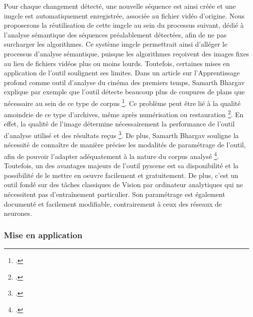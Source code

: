 Pour chaque changement détecté, une nouvelle séquence est ainsi créée et une \gls{imgcle} est automatiquement enregistrée, associée au fichier vidéo d'origine. Nous proposerons la réutilisation de cette \gls{imgcle} au sein du processus suivant, dédié à l'analyse sémantique des séquences préalablement détectées, afin de ne pas surcharger les algorithmes. Ce système \gls{imgcle} permettrait ainsi d’alléger le processus d’analyse sémantique, puisque les algorithmes reçoivent des images fixes au lieu de fichiers vidéos plus ou moins lourds. 
Toutefois, certaines mises en application de l'outil soulignent ses limites. Dans un article sur l'\gls{Apprentissage profond} comme outil d'analyse du cinéma des premiers temps, Samarth Bhargav explique par exemple que l'outil détecte beaucoup plus de coupures de plans que nécessaire au sein de ce type de corpus \footcite{bhargav2019}. Ce problème peut être lié à la qualité amoindrie de ce type d'archives, même après numérisation ou restauration \footcite{bhargav2019}. En effet, la qualité de l'image détermine nécessairement la performance de l'outil d'analyse utilisé et des résultats reçus \footcite{norindr2023}. De plus, Samarth Bhargav souligne la nécessité de connaître de manière précise les modalités de paramétrage de l'outil, afin de pouvoir l'adapter adéquatement à la nature du corpus analysé \footcite{bhargav2019}. Toutefois, un des avantages majeurs de l'outil \gls{pyscene} est sa disponibilité et la possibilité de le mettre en oeuvre facilement et gratuitement. De plus, c'est un outil fondé sur des tâches classiques de \gls{Vision par ordinateur} analytiques qui ne nécessitent pas d'entraînement particulier. Son paramétrage est également documenté et facilement modifiable, contrairement à ceux des réseaux de neurones. 




\subsubsection{Mise en application}

